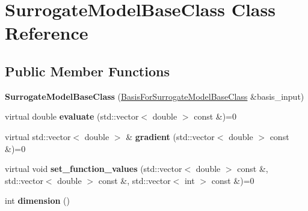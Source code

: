 \hypertarget{class_surrogate_model_base_class}{}\section{Surrogate\+Model\+Base\+Class Class Reference}
\label{class_surrogate_model_base_class}
\subsection*{Public Member Functions}
\begin{DoxyCompactItemize}
\item 
{\bfseries Surrogate\+Model\+Base\+Class} (\hyperlink{class_basis_for_surrogate_model_base_class}{Basis\+For\+Surrogate\+Model\+Base\+Class} \&basis\+\_\+input)\hypertarget{class_surrogate_model_base_class_aa091be4940eaced1d332e0008fb0e7f5}{}\label{class_surrogate_model_base_class_aa091be4940eaced1d332e0008fb0e7f5}

\item 
virtual double {\bfseries evaluate} (std\+::vector$<$ double $>$ const \&)=0\hypertarget{class_surrogate_model_base_class_aa3fdd4282a71cc474510330190c3dea6}{}\label{class_surrogate_model_base_class_aa3fdd4282a71cc474510330190c3dea6}

\item 
virtual std\+::vector$<$ double $>$ \& {\bfseries gradient} (std\+::vector$<$ double $>$ const \&)=0\hypertarget{class_surrogate_model_base_class_a28ce994b3dbb0c5da50989a810a982cb}{}\label{class_surrogate_model_base_class_a28ce994b3dbb0c5da50989a810a982cb}

\item 
virtual void {\bfseries set\+\_\+function\+\_\+values} (std\+::vector$<$ double $>$ const \&, std\+::vector$<$ double $>$ const \&, std\+::vector$<$ int $>$ const \&)=0\hypertarget{class_surrogate_model_base_class_aabe18f199ae6dbf6e85d7d90f6d75759}{}\label{class_surrogate_model_base_class_aabe18f199ae6dbf6e85d7d90f6d75759}

\item 
int {\bfseries dimension} ()\hypertarget{class_surrogate_model_base_class_ab8514c86ba8f3c11210218395c05b963}{}\label{class_surrogate_model_base_class_ab8514c86ba8f3c11210218395c05b963}

\end{DoxyCompactItemize}
